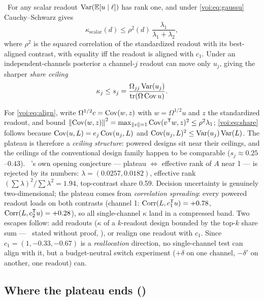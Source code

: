 \begin{law}
\label{voi:law:align}
\tagEstablished\ For any scalar readout $\operatorname{Var}(\mathbb{E}[u\mid\ell])$ has rank one, and under \cref{voi:eq:gaussu} Cauchy--Schwarz gives
\begin{equation}
\kappa_{\mathrm{scalar}}(d) \le \rho^2(d)\,\frac{\lambda_1}{\lambda_1 + \lambda_2},
\label{voi:eq:align}
\end{equation}
where $\rho^2$ is the squared correlation of the standardized readout with its best-aligned contrast, with equality iff the readout is aligned with $c_1$. Under an independent-channels posterior a channel-$j$ readout can move only $u_j$, giving the sharper \emph{share ceiling}
\begin{equation}
\kappa_j \le s_j = \frac{\Omega_{jj}\operatorname{Var}(u_j)}{\operatorname{tr}(\Omega\operatorname{Cov} u)}.
\label{voi:eq:share}
\end{equation}
\end{law}

For \cref{voi:eq:align}, write $\Omega^{1/2}c = \operatorname{Cov}(w, z)$ with $w = \Omega^{1/2}u$ and $z$ the standardized readout, and bound $\left\|\operatorname{Cov}(w,z)\right\|^2 = \max_{\left\|v\right\|=1}\operatorname{Cov}(v^{\mathsf{T}} w,z)^2 \le \rho^2\lambda_1$; \cref{voi:eq:share} follows because $\operatorname{Cov}(u,L) = e_j\operatorname{Cov}(u_j,L)$ and $\operatorname{Cov}(u_j,L)^2 \le \operatorname{Var}(u_j)\operatorname{Var}(L)$. The plateau is therefore a \emph{ceiling structure}: powered designs sit near their ceilings, and the ceilings of the conventional design family happen to be comparable ($s_j \approx 0.25$--$0.43$). \tagRefuted\ 's own opening conjecture --- plateau $\Leftrightarrow$ effective rank of $A$ near 1 --- is rejected by its numbers: $\lambda = (0.0257, 0.0182)$, effective rank $(\sum\lambda)^2/\sum\lambda^2 = 1.94$, top-contrast share 0.59. Decision uncertainty is genuinely two-dimensional; the plateau comes from \emph{correlation spreading}: every powered readout loads on both contrasts (channel 1: $\operatorname{Corr}(L,c_1^{\mathsf{T}} u) = +0.78$, $\operatorname{Corr}(L,c_2^{\mathsf{T}} u) = +0.28$), so all single-channel $\kappa$ land in a compressed band. Two escapes follow: add readouts ($\kappa$ of a $k$-readout design bounded by the top-$k$ share sum --- \tagConjecture\ stated without proof, ), or realign one readout with $c_1$. Since $c_1 = (1, -0.33, -0.67)$ is a \emph{reallocation} direction, no single-channel test can align with it, but a budget-neutral switch experiment ($+\delta$ on one channel, $-\delta'$ on another, one readout) can.

\subsection{Where the plateau ends ()}

